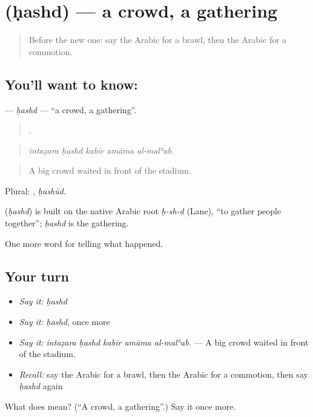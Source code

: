 \section[\texorpdfstring{\ar{حشد} (ḥashd)}{حشد (ḥashd)}]{ (ḥashd) — a crowd, a gathering}

\label{lesson:AR-C352-hashd}



\begin{quote}
Before the new one: say the Arabic for a brawl, then the Arabic for a commotion.
\end{quote}

\subsection*{You'll want to know: }
\textbf{} — \emph{ḥashd} — \textquotedblleft{}a crowd, a gathering\textquotedblright{}.

\begin{quote}
    .
\end{quote}

\begin{quote}
\emph{intaẓara ḥashd kabīr amāma al-malʿab.}
\end{quote}

\begin{quote}
A big crowd waited in front of the stadium.
\end{quote}

Plural: , \emph{ḥushūd}.

\begin{cousinweb}
\textbf{} (\emph{ḥashd}) is built on the native Arabic root \emph{ḥ-sh-d} (Lane), \textquotedblleft{}to gather people together\textquotedblright{}; \emph{ḥashd} is the gathering.
\end{cousinweb}

\begin{grammarlens}[title={What you've built}]
One more word for telling what happened.
\end{grammarlens}

\subsection*{Your turn}
\begin{itemize}
\raggedright
  \item \emph{Say it:} \emph{ḥashd}
  \item \emph{Say it:} \emph{ḥashd}, once more
  \item \emph{Say it:} \emph{intaẓara ḥashd kabīr amāma al-malʿab.} — A big crowd waited in front of the stadium.
  \item \emph{Recall:} say the Arabic for a brawl, then the Arabic for a commotion, then say \emph{ḥashd} again
\end{itemize}

\begin{tcolorbox}[breakable,colback=teal!4,colframe=teal!35!black,title={Before you move on}]
What does  mean? (\textquotedblleft{}A crowd, a gathering\textquotedblright{}.) Say it once more.
\end{tcolorbox}
